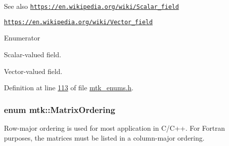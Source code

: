 \begin{DoxySeeAlso}{See also}
\href{https://en.wikipedia.org/wiki/Scalar_field}{\tt https\+://en.\+wikipedia.\+org/wiki/\+Scalar\+\_\+field}

\href{https://en.wikipedia.org/wiki/Vector_field}{\tt https\+://en.\+wikipedia.\+org/wiki/\+Vector\+\_\+field} 
\end{DoxySeeAlso}
\begin{Desc}
\item[Enumerator]\par
\begin{description}
\item[{\em 
\hypertarget{group__c02-enums_ga4c54f2a329cfb4e56213b02a259d19e2a8f3d9a4b6a7b7f2c7afa61ca113d0db9}{S\+C\+A\+L\+A\+R}\label{group__c02-enums_ga4c54f2a329cfb4e56213b02a259d19e2a8f3d9a4b6a7b7f2c7afa61ca113d0db9}
}]Scalar-\/valued field. \item[{\em 
\hypertarget{group__c02-enums_ga4c54f2a329cfb4e56213b02a259d19e2a87752381b583740610f1dfeb07fdad7e}{V\+E\+C\+T\+O\+R}\label{group__c02-enums_ga4c54f2a329cfb4e56213b02a259d19e2a87752381b583740610f1dfeb07fdad7e}
}]Vector-\/valued field. \end{description}
\end{Desc}


Definition at line \hyperlink{mtk__enums_8h_source_l00113}{113} of file \hyperlink{mtk__enums_8h_source}{mtk\+\_\+enums.\+h}.

\hypertarget{group__c02-enums_ga622801bd9f912d0f976c3e383f5f581c}{
\subsubsection[{Matrix\+Ordering}]{\setlength{\rightskip}{0pt plus 5cm}enum {\bf mtk\+::\+Matrix\+Ordering}\hspace{0.3cm}{\ttfamily [strong]}}}\label{group__c02-enums_ga622801bd9f912d0f976c3e383f5f581c}
Row-\/major ordering is used for most application in C/\+C++. For Fortran purposes, the matrices must be listed in a column-\/major ordering.

